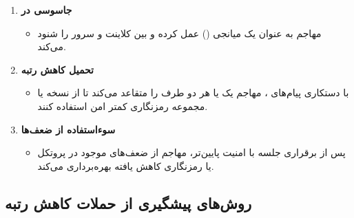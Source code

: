 \begin{enumerate}
    \item \textbf{جاسوسی در }
        \begin{itemize}
            \item مهاجم به عنوان یک میانجی () عمل کرده و  بین کلاینت و سرور را شنود می‌کند.
        \end{itemize}

    \item \textbf{تحمیل کاهش رتبه}
        \begin{itemize}
            \item با دستکاری پیام‌های ، مهاجم یک یا هر دو طرف را متقاعد می‌کند تا از نسخه یا مجموعه رمزنگاری کمتر امن استفاده کنند.
        \end{itemize}

    \item \textbf{سوءاستفاده از ضعف‌ها}
        \begin{itemize}
            \item پس از برقراری جلسه با امنیت پایین‌تر، مهاجم از ضعف‌های موجود در پروتکل یا رمزنگاری کاهش یافته بهره‌برداری می‌کند.
        \end{itemize}
\end{enumerate}

\subsection*{روش‌های پیشگیری از حملات کاهش رتبه}

